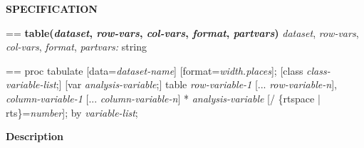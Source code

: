 \documentclass{book}
\makeatletter
\newcommand\Texinfocommandstyletextvar[1]{{\normalfont{}\textsl{#1}}}%
\newenvironment{Texinfopreformatted}{%
  \par\GNUTobeylines\obeyspaces\frenchspacing\parskip=\z@\parindent=\z@}{}
{\catcode`\^^M=13 \gdef\GNUTobeylines{\catcode`\^^M=13 \def^^M{\null\par}}}
\newenvironment{Texinfoindented}{\begin{list}{}{}\item\relax}{\end{list}}
\renewcommand{\_}{\Texinfounderscore\discretionary{}{}{}}
\makeatother
\begin{document}
\noindent{}\textbf{SPECIFICATION}
\begin{Texinfoindented}
\begin{Texinfopreformatted}%
\textbf{table(\Texinfocommandstyletextvar{dataset}, \Texinfocommandstyletextvar{row-vars}, \Texinfocommandstyletextvar{col-vars}, \Texinfocommandstyletextvar{format}, \Texinfocommandstyletextvar{partvars})}
\Texinfocommandstyletextvar{dataset}, \Texinfocommandstyletextvar{row-vars}, \Texinfocommandstyletextvar{col-vars}, \Texinfocommandstyletextvar{format}, \Texinfocommandstyletextvar{partvars:} string
\end{Texinfopreformatted}
\end{Texinfoindented}

\begin{Texinfoindented}
\begin{Texinfopreformatted}%
proc tabulate [data=\Texinfocommandstyletextvar{dataset-name}] [format=\Texinfocommandstyletextvar{width.places}];
[class \Texinfocommandstyletextvar{class-variable-list};]
[var \Texinfocommandstyletextvar{analysis-variable};]
table \Texinfocommandstyletextvar{row-variable-1} [... \Texinfocommandstyletextvar{row-variable-n}],
      \Texinfocommandstyletextvar{column-variable-1} [... \Texinfocommandstyletextvar{column-variable-n}] * \Texinfocommandstyletextvar{analysis-variable}
      [/ \{rtspace | rts\}=\Texinfocommandstyletextvar{number}];
by \Texinfocommandstyletextvar{variable-list};
\end{Texinfopreformatted}
\end{Texinfoindented}

%
%
%

\noindent{}\textbf{Description}
\end{document}

